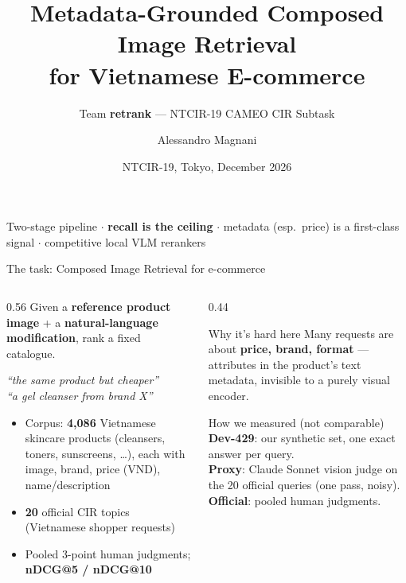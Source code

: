 \documentclass[aspectratio=169,10pt]{beamer}
\title[retrank @ CAMEO]{Metadata-Grounded Composed Image Retrieval\\for Vietnamese E-commerce}
\subtitle{Team \textbf{retrank} --- NTCIR-19 CAMEO CIR Subtask}
\author{Alessandro Magnani}
\institute{Independent}
\date{NTCIR-19, Tokyo, December 2026}
\begin{document}
{
\begin{frame}[plain]
  \titlepage
  \begin{center}\small
  Two-stage pipeline \;$\cdot$\; \textbf{recall is the ceiling} \;$\cdot$\;
  metadata (esp.\ price) is a first-class signal \;$\cdot$\; competitive local VLM rerankers
  \end{center}
\end{frame}}

\begin{frame}{The task: Composed Image Retrieval for e-commerce}
\begin{columns}[T]
\begin{column}{0.56\textwidth}
Given a \textbf{reference product image} + a \textbf{natural-language
modification}, rank a fixed catalogue.
\medskip

\emph{``the same product but cheaper''} \\
\emph{``a gel cleanser from brand X''}
\medskip

\begin{itemize}
  \item Corpus: \textbf{4{,}086} Vietnamese skincare products
        (cleansers, toners, sunscreens, \dots), each with image, brand,
        price (VND), name/description
  \item \textbf{20} official CIR topics (Vietnamese shopper requests)
  \item Pooled 3-point human judgments; \textbf{nDCG@5 / nDCG@10}
\end{itemize}
\end{column}
\begin{column}{0.44\textwidth}
\footnotesize
\begin{block}{Why it's hard here}
Many requests are about \textbf{price, brand, format} --- attributes in the
product's text metadata, invisible to a purely visual encoder.
\end{block}
\begin{block}{How we measured (not comparable)}
\textbf{Dev-429}: our synthetic set, one exact answer per query.\\
\textbf{Proxy}: Claude Sonnet vision judge on the 20 official queries (one pass, noisy).\\
\textbf{Official}: pooled human judgments.
\end{block}
\end{column}
\end{columns}
\end{frame}
\end{document}
